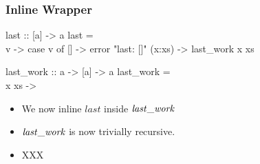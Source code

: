 \documentclass[smaller]{beamer}
\newcommand{\Varid}[1]{\mathit{#1}}
\begin{document}
\begin{frame}[fragile] 
\frametitle{Inline Wrapper}
\begin{semiverbatim}
last :: [a] -> a
last = \\ v -> case v of
                []     -> error "last: []"
                (x:xs) -> last_work x xs

last_work :: a -> [a] -> a
last_work = \\ x xs -> \end{semiverbatim}
\begin{itemize}
\item<1- |alert@1>We now inline \ensuremath{\Varid{last}} inside \ensuremath{\Varid{last\char95 work}}
\item<2- |alert@2>\ensuremath{\Varid{last\char95 work}} is now trivially recursive.
\item<0>XXX
\end{itemize}
\end{frame}
\end{document}
